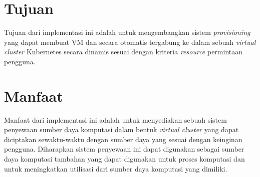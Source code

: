 \section{Tujuan}
\label{sec:Tujuan}

Tujuan dari implementasi ini adalah untuk mengembangkan sistem \emph{provisioning}
yang dapat membuat VM dan secara otomatis tergabung ke dalam sebuah \emph{virtual cluster}
Kubernetes secara dinamis sesuai dengan kriteria
\emph{resource} permintaan pengguna.

\section{Manfaat}
\label{sec:sistematikapenulisan}

Manfaat dari implementasi ini adalah untuk menyediakan sebuah sistem penyewaan
sumber daya komputasi dalam bentuk \emph{virtual cluster} yang dapat
diciptakan sewaktu-waktu dengan sumber daya yang sesuai dengan keinginan pengguna.
Diharapkan sistem penyewaan ini dapat digunakan sebagai sumber daya komputasi
tambahan yang dapat digunakan untuk proses komputasi dan untuk
meningkatkan utilisasi dari sumber daya komputasi yang dimiliki.
